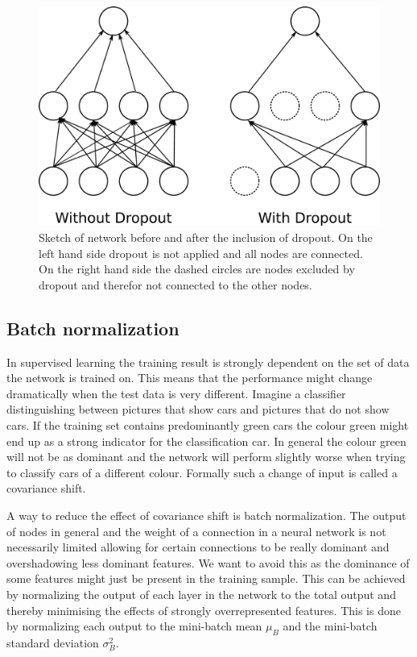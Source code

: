 \begin{figure}[htbp]
	\centering
	\includegraphics[scale = 0.1]{figures_ML/dropout.eps}
	\caption[Dropout Sketch]{Sketch of network before and after the inclusion of dropout. On the left hand side dropout is not applied and all nodes are connected. On the right hand side the dashed circles are nodes excluded by dropout and therefor not connected to the other nodes.}
	\label{fig:dropout}
\end{figure}



\subsection{Batch normalization}
\label{sec:batch_norm}

In supervised learning the training result is strongly dependent on the set of data the network is trained on. This means that the performance might change dramatically when the test data is very different. Imagine a classifier distinguishing between pictures that show cars and pictures that do not show cars. If the training set contains predominantly green cars the colour green might end up as a strong indicator for  the classification car. In general the colour green will not be as dominant and the network will perform slightly worse when trying to classify cars of a different colour. Formally such a change of input is called a covariance shift.

A way to reduce the effect of covariance shift is batch normalization. The output of nodes in general and the weight of a connection in a neural network is not necessarily limited allowing for certain connections to be really dominant and overshadowing less dominant features. We want to avoid this as the dominance of some features might just be present in the training sample. This can be achieved by normalizing the output of each layer in the network to the total output and thereby minimising the effects of strongly overrepresented features. This is done by normalizing each output to the mini-batch mean $\mu_B$ and the mini-batch standard deviation $\sigma_B^2$.

